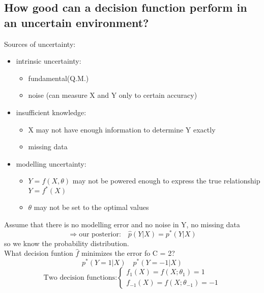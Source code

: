 \documentclass[11pt]{article}
\begin{document}
    \subsection{How good can a decision function perform in an uncertain environment?}
      Sources of uncertainty:
      \begin{itemize}
        \item intrinsic uncertainty:
        \begin{itemize}
          \item fundamental(Q.M.)
          \item noise (can measure X and Y only to certain accuracy)
        \end{itemize}
        \item insufficient knowledge:
        \begin{itemize}
          \item X may not have enough information to determine Y exactly
          \item missing data
        \end{itemize}
        \item modelling uncertainty:
        \begin{itemize}
          \item $Y = f(X, \theta)$ may not be powered enough to express the true
          relationship $Y = f^*(X)$
          \item $\theta$ may not be set to the optimal values
        \end{itemize}
      \end{itemize}
      Assume that there is no modelling error and no noise in Y, no missing data
      \begin{equation*}
        \Rightarrow \text{our posterior:} \quad \hat{p}(Y|X) = p^*(Y|X)
      \end{equation*}
      so we know the probability distribution. \\
      What decision funtion $\hat{f}$ minimizes the error fo C = 2?
      \begin{equation*}
        p^*(Y=1|X) \quad p^*(Y=-1|X)
      \end{equation*}
      \begin{equation*}
        \text{Two decision functions:}
        \begin{cases}
        f_{1}(X) = f(X;\theta_{1}) = 1 \\
        f_{-1}(X) = f(X;\theta_{-1}) = -1
        \end{cases}
      \end{equation*}
\end{document}
